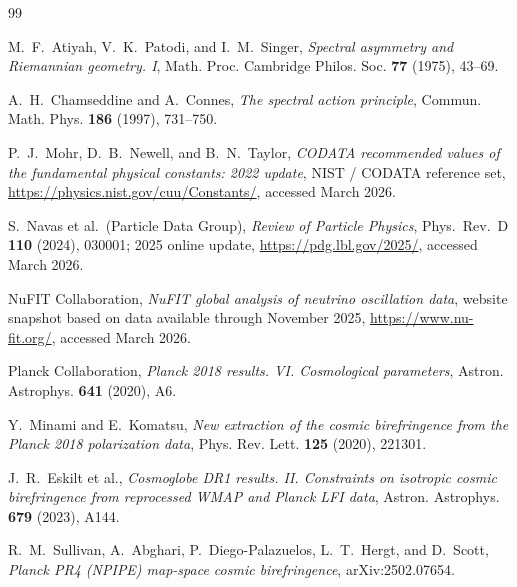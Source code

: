 \begin{thebibliography}{99}

M.~F.~Atiyah, V.~K.~Patodi, and I.~M.~Singer,
\newblock \emph{Spectral asymmetry and Riemannian geometry. I},
\newblock Math. Proc. Cambridge Philos. Soc. \textbf{77} (1975), 43--69.

A.~H.~Chamseddine and A.~Connes,
\newblock \emph{The spectral action principle},
\newblock Commun. Math. Phys. \textbf{186} (1997), 731--750.

P.~J.~Mohr, D.~B.~Newell, and B.~N.~Taylor,
\newblock \emph{CODATA recommended values of the fundamental physical constants: 2022 update},
\newblock NIST / CODATA reference set, \url{https://physics.nist.gov/cuu/Constants/}, accessed March 2026.

S.~Navas et al.\ (Particle Data Group),
\newblock \emph{Review of Particle Physics},
\newblock Phys.\ Rev.\ D \textbf{110} (2024), 030001; 2025 online update, \url{https://pdg.lbl.gov/2025/}, accessed March 2026.

NuFIT Collaboration,
\newblock \emph{NuFIT global analysis of neutrino oscillation data},
\newblock website snapshot based on data available through November 2025, \url{https://www.nu-fit.org/}, accessed March 2026.

Planck Collaboration,
\newblock \emph{Planck 2018 results. VI. Cosmological parameters},
\newblock Astron. Astrophys. \textbf{641} (2020), A6.

Y.~Minami and E.~Komatsu,
\newblock \emph{New extraction of the cosmic birefringence from the Planck 2018 polarization data},
\newblock Phys. Rev. Lett. \textbf{125} (2020), 221301.

J.~R.~Eskilt et al.,
\newblock \emph{Cosmoglobe DR1 results. II. Constraints on isotropic cosmic birefringence from reprocessed WMAP and Planck LFI data},
\newblock Astron. Astrophys. \textbf{679} (2023), A144.

R.~M.~Sullivan, A.~Abghari, P.~Diego-Palazuelos, L.~T.~Hergt, and D.~Scott,
\newblock \emph{Planck PR4 (NPIPE) map-space cosmic birefringence},
\newblock arXiv:2502.07654.

\end{thebibliography}


